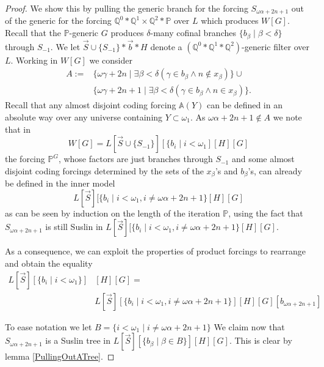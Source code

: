 \documentclass[10pt,a4paper]{amsart}
\newcommand{\forceP}{\mathbb{P}}
\newcommand{\forceQ}{\mathbb{Q}}
\begin{document}
\begin{proof}
We show this by pulling the generic branch for the forcing $S_{\omega \alpha + 2n+1}$ out of the generic for the  forcing $\forceQ^0 \ast \forceQ^1 \times \forceQ^2 \ast \forceP$ over $L$ which produces $W[G]$. 
Recall that the $\forceP$-generic $G$ produces $\delta$-many cofinal branches $\{b_{\beta} \mid \beta < \delta\}$ through $S_{-1}$. We let $\vec{S} \cup \{S_{-1}\}
 \ast \vec{b} \ast H$ denote a $(\forceQ^0 \ast \forceQ^1 \ast \forceQ^2)$-generic filter over $L$. Working in $W[G]$ we consider 
 \begin{align*}
A:= &\{ \omega \gamma +2n \mid \exists \beta < \delta (\gamma \in b_{\beta} \land n \notin x_{\beta}) \} \cup \\& \{\omega \gamma + 2n+1 \mid \exists \beta< \delta (\gamma \in b_{\beta} \land n \in x_{\beta} )\}.
\end{align*}
Recall that any almost disjoint coding forcing $\mathbb{A} (Y)$ can be defined in an absolute way over any universe containing $Y\subset \omega_1$.
As $\omega\alpha +2n+1 \notin A$  we note that in
\[ W[G]= L[\vec{S} \cup \{ S_{-1} \} ] [\{ b_i \mid i < \omega_1] [H] [G]\]
the forcing $\forceP^G$, whose factors are just branches through $S_{-1}$ and some almost disjoint coding forcings determined by the sets of the $x_{\beta}$'s and $b_{\beta}$'s, can already be defined in the inner model
\[ L[\vec{S}] [ \{ b_i \mid i < \omega_1, i \ne \omega\alpha +2n+1 \} [H] [G] \]
as can be seen by induction on the length of the iteration $\forceP$, using the fact that
$S_{\omega \alpha+2n+1}$ is still Suslin in $L[\vec{S}]  [\{ b_i \mid i < \omega_1, i \ne \omega\alpha +2n+1 \} [H] [G] $.

As a consequence, we can exploit the properties of product forcings to rearrange and obtain the equality
\begin{align*}
L[\vec{S} ] [ \{ b_i \mid i < \omega_1 \} ]& [H] [G]= \\& L[\vec{S}]  [ \{ b_i \mid i < \omega_1, i \ne \omega\alpha +2n+1 \} ] [H] [G] [b_{\omega\alpha +2n+1}] 
\end{align*}




To ease notation we let $B= \{ i <\omega_1 \mid i \ne \omega \alpha +2n +1 \}$
We claim now that $S_{\omega\alpha +2n+1}$ is a Suslin tree in $L[\vec{S} ] [\{b_{\beta} \mid \beta \in B \} ] [H] [G]$. This is clear by lemma \ref{PullingOutATree}.



\end{proof}
\end{document}
